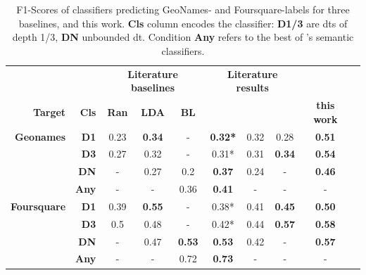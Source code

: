 \begin{table}[H]
	\label{tab:f1_geonames_foursquare_all}
\end{table}



\begin{table}[H]
	\centering
	\begin{tabular}{rr|ccc|ccc|cc} 
	& & \multicolumn{3}{c|}{\footnotesize \textbf{Literature baselines}} & \multicolumn{3}{c|}{\footnotesize \textbf{Literature results}} & \\ \noalign{\vskip-2pt}
	\textbf{Target} &
	  \textbf{Cls} &
	  \textbf{Ran} &
	  \textbf{LDA} &
	  \textbf{BL} &
	  \textbf{\cite{Derrac2015}} &
	  \textbf{\cite{Ager2018}} &
	  \textbf{\cite{Alshaikh2020}} &
	  \textbf{this work} \\ \midrule
	\textbf{Geonames}    & \textbf{D1}  & 0.23 & \textbf{0.34} & -             & \textbf{0.32*} & 0.32 & 0.28          & \textbf{0.51} \\
						 & \textbf{D3}  & 0.27 & 0.32          & -             & 0.31*          & 0.31 & \textbf{0.34} & \textbf{0.54} \\
						 & \textbf{DN}  & -    & 0.27          & 0.2           & \textbf{0.37}  & 0.24 & -             & \textbf{0.46} \\
	\multicolumn{1}{l}{} & \textbf{Any} & -    & -             & 0.36          & \textbf{0.41}  & -    & -             & -            \\
	\textbf{Foursquare}  & \textbf{D1}  & 0.39 & \textbf{0.55} & -             & 0.38*          & 0.41 & \textbf{0.45} & \textbf{0.50} \\
	& \textbf{D3}  & 0.5  & 0.48          & -             & 0.42*          & 0.44 & \textbf{0.57} & \textbf{0.58} \\
	& \textbf{DN}  & -    & 0.47          & \textbf{0.53} & \textbf{0.53}  & 0.42 & -             & \textbf{0.57} \\
\multicolumn{1}{l}{} & \textbf{Any} & -    & -             & 0.72          & \textbf{0.73}  & -    & -             & -             
	\end{tabular}%
	\caption[F1-Scores of classifiers for placetype-taxonomies of \mainalgos and this work]{F1-Scores of classifiers predicting GeoNames- and Foursquare-labels for three baselines, \mainalgos and this work. \textbf{Cls} column encodes the classifier: \textbf{D1/3} are \glspl{dt} of depth 1/3, \textbf{DN} unbounded \gls{dt}. Condition \textbf{Any} refers to the best of \cite{Derrac2015}'s  semantic classifiers. \hspace{1ex}
}
\end{table}
